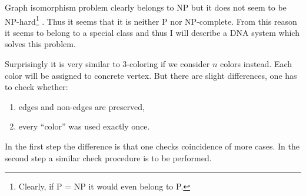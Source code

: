 Graph isomorphism problem clearly belongs to NP but it does not seem to be NP-hard\footnote{Clearly, if P = NP it would even belong to P.} \cite{borec_z_wiki}. Thus it seems that it is neither P nor NP-complete. From this reason it seems to belong to a special class and thus I will describe a DNA system which solves this problem. %

Surprisingly it is very similar to 3-coloring if we consider $n$ colors instead. Each color will be assigned to concrete vertex. But there are slight differences, one has to check whether:
\begin{enumerate}
	\item edges and non-edges are preserved,
	\item every ``color'' was used exactly once.
\end{enumerate}
In the first step the difference is that one checks coincidence of more cases. In the second step a similar check procedure is to be performed.


